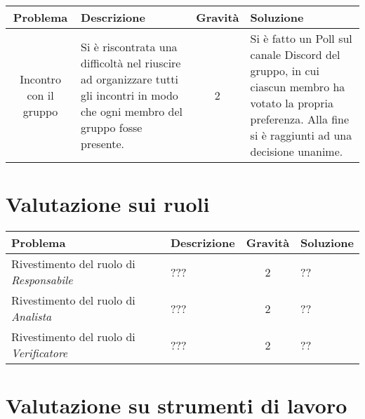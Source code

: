 \quad
\def\tabularxcolumn#1{m{#1}}
{
	
	\begin{center}
		\renewcommand{\arraystretch}{1.4}
		\begin{tabularx}{\textwidth}{|c|X|c|X|}
			\hline
			\rowcolor{airforceblue}
			\textbf{Problema} & \textbf{Descrizione} & \textbf{Gravità} & \textbf{Soluzione}\\
			\hline
			Incontro con il gruppo & Si è riscontrata una difficoltà nel riuscire ad organizzare tutti gli incontri in modo che ogni membro del gruppo fosse presente. & 2 & Si è fatto un Poll sul canale Discord del gruppo, in cui ciascun membro ha votato la propria preferenza. Alla fine si è raggiunti ad una decisione unanime. \\
			\hline
		\end{tabularx}
	\end{center}

\section{Valutazione sui ruoli}  \label{ValutazionePerIlMiglioramentoValutazioneSuiRuoli}

\quad
\def\tabularxcolumn#1{m{#1}}
{
	
	\begin{center}
		\renewcommand{\arraystretch}{1.4}
		\begin{tabularx}{\textwidth}{|X|X|c|X|}
			\hline
			\rowcolor{airforceblue}
			\textbf{Problema} & \textbf{Descrizione} & \textbf{Gravità} & \textbf{Soluzione}\\
			\hline
			Rivestimento del ruolo di \textit{Responsabile} & ??? & 2 & ?? \\
			\hline
			Rivestimento del ruolo di \textit{Analista} & ??? & 2 & ?? \\
			\hline
			Rivestimento del ruolo di \textit{Verificatore} & ??? & 2 & ?? \\
			\hline
		\end{tabularx}
	\end{center}

\section{Valutazione su strumenti di lavoro}  \label{ValutazionePerIlMiglioramentoValutazioneSuStrumentiDiLavoro}

}}
